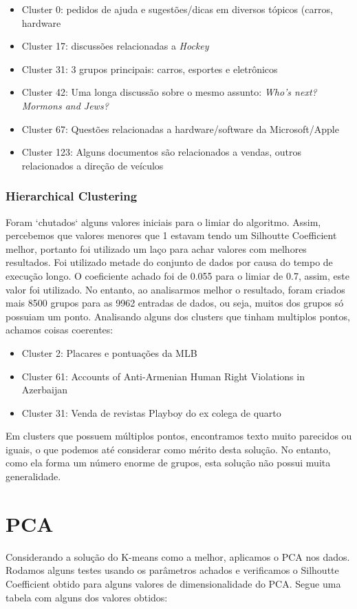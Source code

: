 \documentclass[conference]{IEEEtran}
\begin{document}
\begin{itemize}
\item Cluster 0: pedidos de ajuda e sugestões/dicas em diversos tópicos (carros, hardware
\item Cluster 17: discussões relacionadas a \textit{Hockey}
\item Cluster 31: 3 grupos principais: carros, esportes e eletrônicos
\item Cluster 42: Uma longa discussão sobre o mesmo assunto: \textit{Who's next? Mormons and Jews?}
\item Cluster 67: Questões relacionadas a hardware/software da Microsoft/Apple
\item Cluster 123: Alguns documentos são relacionados a vendas, outros relacionados a direção de veículos
\end{itemize}

\subsubsection{Hierarchical Clustering}
Foram `chutados`  alguns valores iniciais para o limiar do algoritmo. Assim, percebemos que valores menores que 1 estavam tendo um Silhoutte Coefficient melhor, portanto foi utilizado um laço para achar valores com melhores resultados. Foi utilizado metade do conjunto de dados por causa do tempo de execução longo. O coeficiente achado foi de 0.055 para o limiar de 0.7, assim, este valor foi utilizado.
No entanto, ao analisarmos melhor o resultado, foram criados mais 8500 grupos para as 9962 entradas de dados, ou seja, muitos dos grupos só possuiam um ponto. Analisando alguns dos clusters que tinham multiplos pontos, achamos coisas coerentes:

\begin{itemize}
\item Cluster 2: Placares e pontuações da MLB
\item Cluster 61: Accounts of Anti-Armenian Human Right Violations in Azerbaijan
\item Cluster 31: Venda de revistas Playboy do ex colega de quarto
\end{itemize}

Em clusters que possuem múltiplos pontos, encontramos texto muito parecidos ou iguais, o que podemos até considerar como mérito desta solução. No entanto, como ela forma um número enorme de grupos, esta solução não possui muita generalidade.

\section{PCA}
Considerando a solução do K-means como a melhor, aplicamos o PCA nos dados. Rodamos alguns testes usando os parâmetros achados e verificamos o Silhoutte Coefficient obtido para alguns valores de dimensionalidade do PCA. Segue uma tabela com alguns dos valores obtidos:
\end{document}
